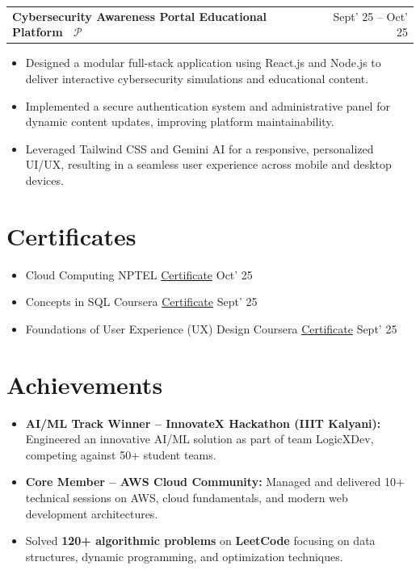 \documentclass[10pt, a4paper]{article}
\makeatletter
\newcommand{\entryrow}[2]{%
  \noindent\begin{tabularx}{\linewidth}{@{}X@{\hspace{4pt}}r@{}}
    {\color{headingblue}\bfseries\fontsize{8.5pt}{10pt}\selectfont #1} &
    {\fontsize{8.5pt}{10pt}\selectfont #2}
  \end{tabularx}\par\vspace{1pt}%
}
\makeatother
\begin{document}
\vspace{5pt}
\entryrow{Cybersecurity Awareness Portal \textbar{} Educational Platform \textbar{}~\href{https://github.com/G4uravXDev}{\textcolor{linknavy}{\ensuremath{\mathcal{P}}}}}{Sept' 25 -- Oct' 25}
\begin{itemize}
  \item Designed a modular full-stack application using React.js and Node.js to deliver interactive cybersecurity simulations and educational content.
  \item Implemented a secure authentication system and administrative panel for dynamic content updates, improving platform maintainability.
  \item Leveraged Tailwind CSS and Gemini AI for a responsive, personalized UI/UX, resulting in a seamless user experience across mobile and desktop devices.
\end{itemize}

\section{Certificates}

\begin{itemize}[itemsep=5pt]
  \item Cloud Computing \textbar{} NPTEL \textbar{} \href{https://github.com/G4uravXDev}{\textcolor{linknavy}{Certificate}}
        \hfill {\fontsize{8.5pt}{10pt}\selectfont Oct' 25}
  \item Concepts in SQL \textbar{} Coursera \textbar{} \href{https://github.com/G4uravXDev}{\textcolor{linknavy}{Certificate}}
        \hfill {\fontsize{8.5pt}{10pt}\selectfont Sept' 25}
  \item Foundations of User Experience (UX) Design \textbar{} Coursera \textbar{} \href{https://github.com/G4uravXDev}{\textcolor{linknavy}{Certificate}}
        \hfill {\fontsize{8.5pt}{10pt}\selectfont Sept' 25}
\end{itemize}

\section{Achievements}

\begin{itemize}
  \item \textbf{AI/ML Track Winner -- InnovateX Hackathon (IIIT Kalyani):} Engineered an innovative AI/ML solution as part of team LogicXDev, competing against 50+ student teams.
  \item \textbf{Core Member -- AWS Cloud Community:} Managed and delivered 10+ technical sessions on AWS, cloud fundamentals, and modern web development architectures.
  \item Solved \textbf{120+ algorithmic problems} on \textbf{LeetCode} focusing on data structures, dynamic programming, and optimization techniques.
\end{itemize}
\end{document}
